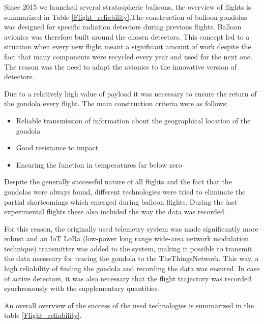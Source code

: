 \documentclass{Rpd}
\begin{document}
Since 2015 we launched several stratospheric balloons, the overview of flights is summarized in Table \ref{Flight_reliability}.The construction of balloon gondolas was designed for specific radiation detectors during previous flights. Balloon avionics was therefore built around the chosen detectors.
This concept led to a situation when every new flight meant a significant amount of work despite the fact that many components were recycled every year and used for the next one. The reason was the need to adapt the avionics to the innovative version of detectors.

Due to a relatively high value of payload it was necessary to ensure the return of the gondola every flight. The main construction criteria were as follows:


\begin{itemize}
\item Reliable transmission of information about the geographical location of the gondola
\item Good resistance to impact
\item Ensuring the function in temperatures far below zero
\end{itemize}


Despite the generally successful nature of all flights and the fact that the gondolas were always found, different technologies were tried to eliminate the partial shortcomings which emerged during balloon flights. During the last experimental flights these also included the way the data was recorded.

For this reason, the originally used telemetry system was made significantly more robust and an IoT LoRa (low-power long range wide-area network modulation technique) transmitter was added to the system, making it possible to transmit the data necessary for tracing the gondola to the TheThingsNetwork. This way, a high reliability of finding the gondola and recording the data was ensured. In case of active detectors, it was also necessary that the flight trajectory was recorded synchronously with the supplementary quantities.


An overall overview of the success of the used technologies is summarized in the table \ref{Flight_reliability}.
\end{document}
